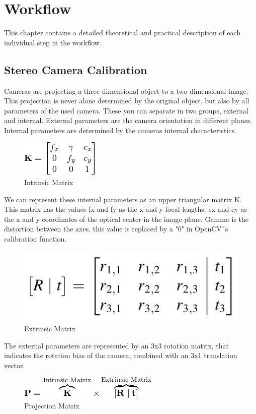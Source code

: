 \documentclass[journal,onecolumn]{IEEEtran}
\begin{document}
\section{Workflow}
\noindent
This chapter contains a detailed theoretical and practical description of each individual step in the workflow.
\subsection{Stereo Camera Calibration}
\noindent
Cameras are projecting a three dimensional object to a two dimensional image. This projection is never alone determined by the original object, but also by all parameters of the used camera. These you can separate in two groups, external and internal. External parameters are the camera orientation in different planes. Internal parameters are determined by the cameras internal characteristics.
\begin{figure}[H]
	\centering
	\includegraphics[scale=0.8]{intrinsicMatrix.png}
	\caption{Intrinsic Matrix}
\end{figure}
\noindent
We can represent these internal parameters as an upper triangular matrix K. This matrix has the values fx and fy as the x and y focal lengths. cx and cy as the x and y coordinates of the optical center in the image plane. Gamma is the distortion between the axes, this value is replaced by a "0" in OpenCV´s calibration function.\newline
\begin{figure}[H]
	\centering
	\includegraphics[scale=0.4]{extrinsicMatrix.png}
	\caption{Extrinsic Matrix}
\end{figure}
\noindent
The external parameters are represented by an 3x3 rotation matrix, that indicates the rotation bias of the camera, combined with an 3x1 translation vector.\newline
\begin{figure}[H]
	\centering
	\includegraphics[scale=0.7]{projectionMatrix.png}
	\caption{Projection Matrix}
\end{figure}
\end{document}
